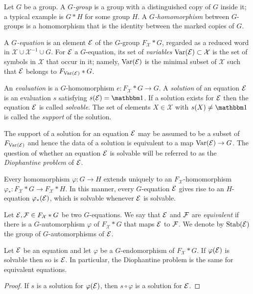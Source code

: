 \documentclass[a4paper,11pt]{amsart}
\begin{document}
\begin{defi}
  Let $G$ be a group. A \emph{$G$-group} is a group with a
  distinguished copy of $G$ inside it; a typical example is 
  $G*H$ for some group $H$. A \emph{$G$-homomorphism} 
  between $G$-groups is a homomorphism
  that is the identity between the marked copies of $G$.

  A \emph{$G$-equation} is an element $\mathcal{E}$ of the $G$-group
  $F_{\mathcal{X}} * G$, regarded as a reduced word in
  $\mathcal X\cup\mathcal X^{-1}\cup G$. For $\mathcal{E}$ a $G$-equation,
  its set of \emph{variables} $\textup{Var}(\mathcal{E})\subset \mathcal{X}$ is the
  set of symbols in $\mathcal{X}$ that occur in it; namely,
  $\textup{Var}(\mathcal{E})$ is the minimal subset of $\mathcal{X}$ such that
  $\mathcal{E}$ belongs to $F_{\textup{Var}(\mathcal{E})}*G$.

  An \emph{evaluation} is a $G$-homomorphism $e\colon F_{\mathcal{X}} * G \to G$.
  A \emph{solution} of an equation $\mathcal{E}$ is an evaluation $s$
  satisfying $s(\eq{E})=\id$. If a solution exists for $\mathcal{E}$ then the
  equation $\mathcal{E}$ is called \emph{solvable}. The set of elements
  $X\in \mathcal{X}$ with $s(X)\neq\id$ is called the \emph{support} of the solution.
\end{defi}

The support of a solution for an equation $\mathcal{E}$ may be assumed to be
a subset of $F_{\textup{Var}(\mathcal{E})}$ and hence the data of a solution
is equivalent to a map $\textup{Var}(\mathcal{E}) \to G$.  The question of whether an
equation $\mathcal{E}$ is solvable will be referred to as the \emph{Diophantine
problem} of $\mathcal{E}$.

Every homomorphism $\varphi \colon G \to H$ extends uniquely to an
$F_{\mathcal{X}}$-ho\-mo\-morphism $\varphi_* \colon F_{\mathcal{X}}*G \to F_{\mathcal{X}}*H$.
In this manner, every $G$-equation $\mathcal{E}$ gives rise to an $H$-equation $\varphi_*(\mathcal{E})$,
which is solvable whenever $\mathcal{E}$ is solvable.

\begin{defi}
  Let $\mathcal{E},\mathcal{F}\in F_{\mathcal{X}}* G$ be two $G$-equations. We
  say that $\mathcal{E}$ and $\mathcal{F}$ are \emph{equivalent} if there is a
  $G$-automorphism $\varphi$ of $F_{\mathcal{X}}*G$ that maps $\mathcal{E}$
  to $\mathcal{F}$. We denote by $\operatorname{Stab}(\mathcal{E})$ the group of
  $G$-automorphisms of $\mathcal{E}$.
\end{defi}
\begin{lem}
  Let $\mathcal{E}$ be an equation and let $\varphi$ be a $G$-endomorphism of
  $F_{\mathcal{X}}*G$. If $\varphi(\mathcal{E})$ is solvable then so is $\mathcal{E}$. In particular,
  the Diophantine problem is the same for equivalent equations.
\end{lem}
\begin{proof}
  If $s$ is a solution for $\varphi(\mathcal{E})$, then $s\circ\varphi$ is a
  solution for $\mathcal{E}$.
\end{proof}
\end{document}
